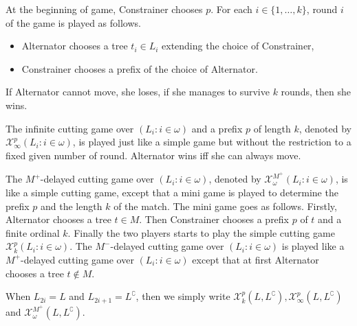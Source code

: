 At the beginning of game, Constrainer chooses $p$.
For each $i \in \{1, \dots, k \}$, round $i$ of the game is played as follows.
\begin{itemize}
\item Alternator chooses a tree $t_i \in L_i$ extending the choice of Constrainer, 
\item Constrainer chooses a prefix of the choice of Alternator.
\end{itemize}
If Alternator cannot move, she loses, if she manages to survive $k$ rounds, then she wins.

The infinite cutting game over $( L_i : i \in \omega )$ and a prefix $p$ of length $k$, denoted by $\mathcal{X}^p_\infty(L_i : i \in \omega )$, is played just like a simple game but without the restriction to a fixed given number of round. Alternator wins iff she can always move.

The $M^+$-delayed cutting game over $( L_i : i \in \omega )$, denoted by $\mathcal{X}^{M^+}_\omega(L_i : i \in \omega )$, is like a simple cutting game, except that a mini game is played to determine the prefix $p$ and the length $k$ of the match. 
The mini game goes as follows. Firstly, Alternator chooses a tree $t \in M$. Then Constrainer chooses a prefix $p$ of $t$ and a finite ordinal $k$. Finally the two players starts to play the simple cutting game $\mathcal{X}^p_k(L_i : i \in \omega )$. 
The $M^-$-delayed cutting game over $( L_i : i \in \omega )$ is played like a $M^+$-delayed cutting game over $( L_i : i \in \omega )$ except that at first Alternator chooses a tree $t \notin M$.

When $L_{2i}=L$ and $L_{2i +1}=L^\complement$, then we simply write $\mathcal{X}^p_k(L, L^\complement), \mathcal{X}^p_\infty(L, L^\complement)$ and  $\mathcal{X}^{M^+}_\omega(L, L^\complement)$.

